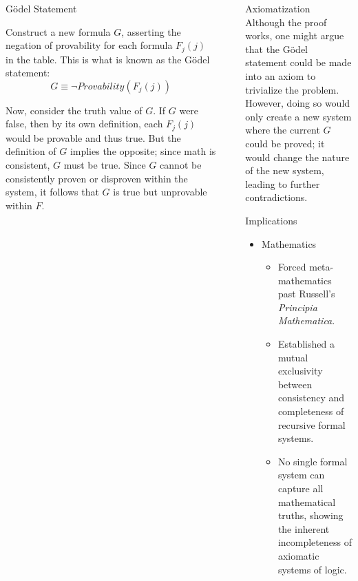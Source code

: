 \documentclass[final]{beamer}
\newlength{\sepwidth}
\newlength{\colwidth}
\newcommand{\separatorcolumn}{\begin{column}{\sepwidth}\end{column}}
\begin{document}
\begin{frame}[t]
\begin{columns}[t]
\begin{column}{\colwidth}
\begin{block}{Gödel Statement}

Construct a new formula $G$, asserting the negation of provability for each formula $F_j(j)$ in the table. This is what is known as the Gödel statement:
$$G \equiv \neg Provability(F_j(j))$$

 Now, consider the truth value of $G$. If $G$ were false, then by its own definition, each $F_j(j)$ would be provable and thus true. But the definition of $G$ implies the opposite; since math is consistent, $G$ must be true. Since $G$ cannot be consistently proven or disproven within the system, it follows that $G$ is true but unprovable within $F$.
 
 \end{block}

\end{column}


\separatorcolumn

\begin{column}{\colwidth}

\begin{block}{Axiomatization}
Although the proof works, one might argue that the Gödel statement could be made into an axiom to trivialize the problem.\\
However, doing so would only create a new system where the current $G$ could be proved; it would change the nature of the new system, leading to further contradictions.

\end{block}

\begin{block}{Implications}

 \begin{itemize}
      \item Mathematics
        \begin{itemize}
        
            \item Forced meta-mathematics past Russell's \textit{Principia Mathematica}.
            \item Established a mutual exclusivity between consistency and completeness of recursive formal systems.
            \item No single formal system can capture all mathematical truths, showing the inherent incompleteness of axiomatic systems of logic.
            
        \end{itemize}
      

\end{itemize}
\end{block}
\end{column}
\end{columns}
\end{frame}
\end{document}
